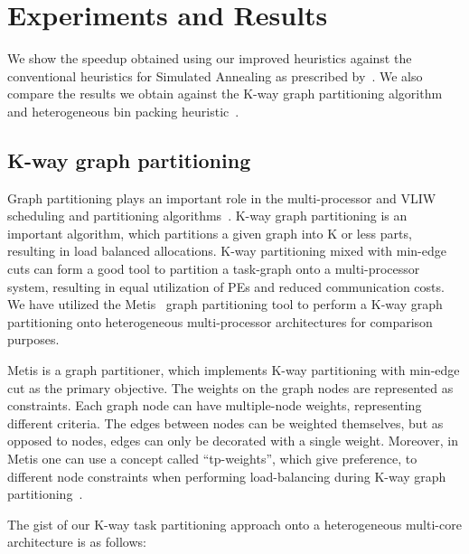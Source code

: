 \section{Experiments and Results}

We show the speedup obtained using our improved heuristics against the
conventional heuristics for Simulated Annealing as prescribed
by~\cite{hors06}. We also compare the results we obtain against the
K-way graph partitioning algorithm~\cite{gkar95} and heterogeneous bin
packing heuristic~\cite{mmar11}.

\subsection{K-way graph partitioning}
\label{sec:k-way-graph}

Graph partitioning plays an important role in the multi-processor and
VLIW scheduling and partitioning
algorithms~\cite{aale01,kpur99,enys98}. K-way graph partitioning is an
important algorithm, which partitions a given graph into K or less
parts, resulting in load balanced allocations. K-way partitioning mixed
with min-edge cuts can form a good tool to partition a task-graph onto a
multi-processor system, resulting in equal utilization of PEs and
reduced communication costs. We have utilized the Metis~\cite{gkar95}
graph partitioning tool to perform a K-way graph partitioning onto
heterogeneous multi-processor architectures for comparison purposes.

Metis is a graph partitioner, which implements K-way partitioning with
min-edge cut as the primary objective. The weights on the graph nodes
are represented as constraints. Each graph node can have multiple-node
weights, representing different criteria. The edges between nodes can be
weighted themselves, but as opposed to nodes, edges can only be
decorated with a single weight. Moreover, in Metis one can use a concept
called ``tp-weights'', which give preference, to different node
constraints when performing load-balancing during K-way graph
partitioning~\cite{gkar95}. %

The gist of our K-way task partitioning approach onto a heterogeneous
multi-core architecture is as follows:

